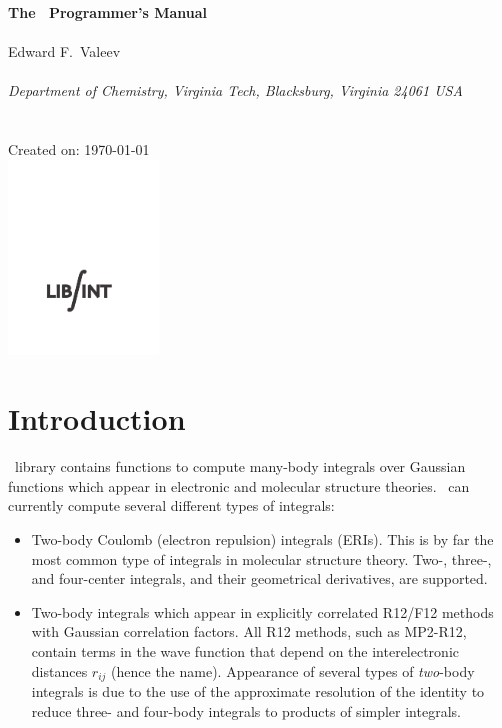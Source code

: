 \documentclass[10pt]{article}
\begin{document}


\begin{center}
{\bf {\Large The \LIBINT\ Programmer's Manual}} \\
~\\
Edward F.\ Valeev \\
~\\
{\em Department of Chemistry, Virginia Tech, Blacksburg, Virginia 24061 USA}\\
~\\
\LIBINTv \\
Created on: \today \\
\vspace{30\baselineskip}
\includegraphics[width=0.3\textwidth]{Libint_Logo3_alt}

\end{center}

\thispagestyle{empty}

\newpage
\section{Introduction}
\LIBINT\ library contains functions to compute many-body integrals over Gaussian
functions which appear in electronic and molecular structure theories.
\LIBINTv \cite{Libint1}\ can currently compute several different types of integrals:

\begin{itemize}

\item Two-body Coulomb (electron repulsion) integrals (ERIs). This is by
far the most common type of integrals in molecular structure theory. Two-,
three-, and four-center integrals, and their geometrical derivatives, are
supported.

\item Two-body integrals which appear in explicitly correlated R12/F12 methods
with Gaussian correlation factors.\cite{Kutzelnigg85,Kutzelnigg91,Persson96} All R12 methods, such as
MP2-R12, contain terms in the wave function that depend on the interelectronic distances
$r_{ij}$ (hence the name). Appearance of several types of {\em two}-body integrals
is due to the use of the approximate resolution of the identity to reduce three- and four-body
integrals to products of simpler integrals.

\end{itemize}
\end{document}
